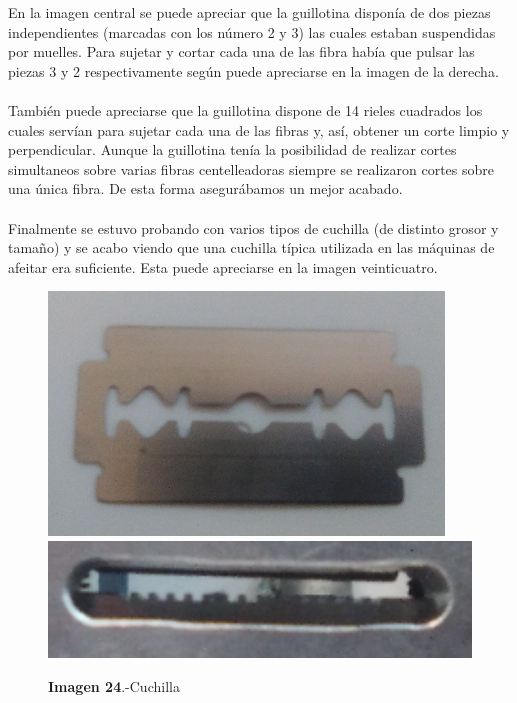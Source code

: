 \documentclass[11pt, a4paper]{article}
\begin{document}
En la imagen central se puede apreciar que la guillotina disponía de dos piezas independientes (marcadas con los número 2 y 3) las cuales estaban suspendidas por muelles. Para sujetar y cortar cada una de las fibra había que pulsar las piezas 3 y 2 respectivamente según puede apreciarse en la imagen de la derecha. 

\paragraph {} 
También puede apreciarse que la guillotina dispone de 14 rieles cuadrados los cuales servían para sujetar cada una de las fibras y, así, obtener un corte limpio y perpendicular. Aunque la guillotina tenía la posibilidad de realizar cortes simultaneos sobre varias fibras centelleadoras siempre se realizaron cortes sobre una única fibra. De esta forma asegurábamos un mejor acabado.


\paragraph {}
Finalmente se estuvo probando con varios tipos de cuchilla (de distinto grosor y tamaño) y se acabo viendo que una cuchilla típica utilizada en las máquinas de afeitar era suficiente. Esta puede apreciarse en la imagen veinticuatro.

\begin{figure}[htb]
\centering
{
\includegraphics[scale=0.3]{cuchilla.png} 
}
{
\includegraphics[scale=0.3]{Guillotina5.png} 
}
\caption{\textbf{Imagen 24}.-Cuchilla}
\end{figure} 
\end{document}
